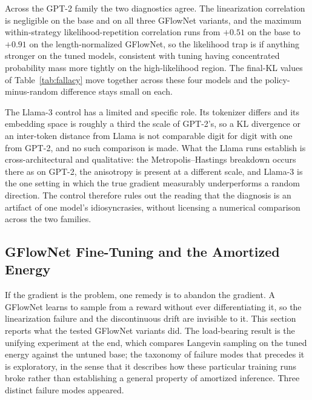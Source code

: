 Across the GPT-2 family the two diagnostics agree. The linearization correlation is negligible on the base and on all three GFlowNet variants, and the maximum within-strategy likelihood-repetition correlation runs from $+0.51$ on the base to $+0.91$ on the length-normalized GFlowNet, so the likelihood trap is if anything stronger on the tuned models, consistent with tuning having concentrated probability mass more tightly on the high-likelihood region. The final-KL values of Table~\ref{tab:fallacy} move together across these four models and the policy-minus-random difference stays small on each.

The Llama-3 control has a limited and specific role. Its tokenizer differs and its embedding space is roughly a third the scale of GPT-2's, so a KL divergence or an inter-token distance from Llama is not comparable digit for digit with one from GPT-2, and no such comparison is made. What the Llama runs establish is cross-architectural and qualitative: the Metropolis--Hastings breakdown occurs there as on GPT-2, the anisotropy is present at a different scale, and Llama-3 is the one setting in which the true gradient measurably underperforms a random direction. The control therefore rules out the reading that the diagnosis is an artifact of one model's idiosyncrasies, without licensing a numerical comparison across the two families.

\subsection{GFlowNet Fine-Tuning and the Amortized Energy}
\label{sec:results-gfn}

If the gradient is the problem, one remedy is to abandon the gradient. A GFlowNet \citep{bengio2021flow, hu2024amortizing} learns to sample from a reward without ever differentiating it, so the linearization failure and the discontinuous drift are invisible to it. This section reports what the tested GFlowNet variants did. The load-bearing result is the unifying experiment at the end, which compares Langevin sampling on the tuned energy against the untuned base; the taxonomy of failure modes that precedes it is exploratory, in the sense that it describes how these particular training runs broke rather than establishing a general property of amortized inference. Three distinct failure modes appeared.

